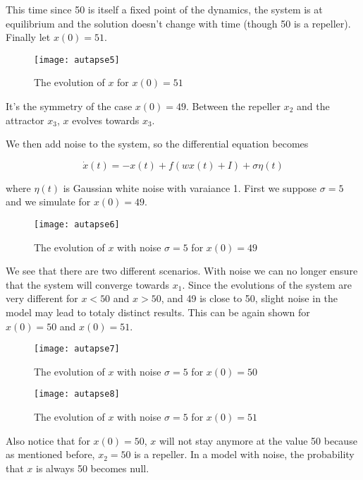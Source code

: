 \noindent
This time since 50 is itself a fixed point of the dynamics, the system 
is at equilibrium and the solution doesn't change with time (though 50
is a repeller). Finally let $x(0) = 51$.

\vspace{-1em}
\begin{figure}[H]
  \centering
  \texttt{[image: autapse5]}
  \caption{The evolution of $x$ for $x(0) = 51$}
\end{figure}

\noindent
It's the symmetry of the case $x(0) = 49$. Between the repeller $x_2$ and
the attractor $x_3$, $x$ evolves towards $x_3$.

We then add noise to the system, so the differential equation becomes

\[\dot{x}(t) = -x(t) + f(wx(t)+I) + \sigma\eta(t)\]

\noindent
where $\eta(t)$ is Gaussian white noise with varaiance 1. First we suppose 
$\sigma = 5$ and we simulate for $x(0) = 49$.

\vspace{-1em}
\begin{figure}[H]
  \centering
  \texttt{[image: autapse6]}
  \caption{The evolution of $x$ with noise $\sigma = 5$ for $x(0) = 49$}
\end{figure}

We see that there are two different scenarios. With noise we can no longer
ensure that the system will converge towards $x_1$. Since the evolutions of
the system are very different for $x < 50$ and $x > 50$, and 49 is close
to 50, slight noise in the model may lead to totaly distinct results. This can
be again shown for $x(0) = 50$ and $x(0) = 51$.

\vspace{-1em}
\begin{figure}[H]
  \centering
  \texttt{[image: autapse7]}
  \caption{The evolution of $x$ with noise $\sigma = 5$ for $x(0) = 50$}
\end{figure}

\vspace{-1em}
\begin{figure}[H]
  \centering
  \texttt{[image: autapse8]}
  \caption{The evolution of $x$ with noise $\sigma = 5$ for $x(0) = 51$}
\end{figure}

Also notice that for $x(0) = 50$, $x$ will not stay anymore at the value 50 
because as mentioned before, $x_2 = 50$ is a repeller. In a model with noise,
the probability that $x$ is always 50 becomes null. 

